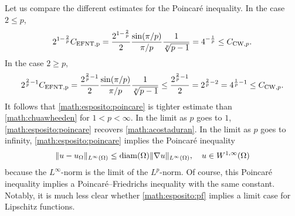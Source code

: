 \documentclass[a4paper]{amsart}
\begin{document}
\begin{remark}
    Let us compare the different estimates for the Poincar\'e inequality.
    In the case $2 \leq p$, 
    \begin{align*}
        2^{1-\frac 2 p}
        C_{\rm{EFNT},p}
        =
        \frac{ 2^{1-\frac 2 p} }{2}
        \frac{ \sin(\pi/p) }{ \pi/p }
        \frac{ 1 }{ \sqrt[p]{p-1} }
        =
        4^{-\frac 1 p}
        \leq
        C_{{\rm CW},p} 
        .
    \end{align*}
    In the case $2 \geq p$, 
    \begin{align*}
        2^{\frac 2 p - 1}
        C_{\rm{EFNT},p}
        =
        \frac{ 2^{\frac 2 p - 1} }{2}
        \frac{ \sin(\pi/p) }{ \pi/p }
        \frac{ 1 }{ \sqrt[p]{p-1} }
        \leq
        \frac{ 2^{\frac 2 p-1} }{2}
        =
        2^{\frac 2 p - 2}
        =
        4^{\frac 1 p - 1}
        \leq
        C_{{\rm CW},p} 
        .
    \end{align*}
    It follows that \eqref{math:esposito:poincare} is tighter estimate than \eqref{math:chuawheeden} for $1 < p < \infty$.
    In the limit as $p$ goes to $1$, \eqref{math:esposito:poincare} recovers \eqref{math:acostaduran}. 
    In the limit as $p$ goes to infinity, \eqref{math:esposito:poincare} implies the Poincar\'e inequality 
    \begin{align*}
        \| u - u_{\Omega} \|_{L^{\infty}(\Omega)}
        \leq 
        {\operatorname{diam}}(\Omega)
        \| \nabla u \|_{L^{\infty}(\Omega)}
        ,
        \quad
        u \in W^{1,\infty}(\Omega)
    \end{align*}
    because the $L^{\infty}$-norm is the limit of the $L^{p}$-norm. 
    Of course, this Poincar\'e inequality implies a Poincar\'e--Friedrichs inequality with the same constant. 
    Notably, it is much less clear whether \eqref{math:esposito:pf} implies a limit case for Lipschitz functions. 
\end{remark}
\end{document}
